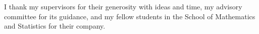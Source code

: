 I thank my supervisors for their generosity with ideas and time, my advisory committee for its
guidance, and my fellow students in the School of Mathematics and Statistics for their company.
